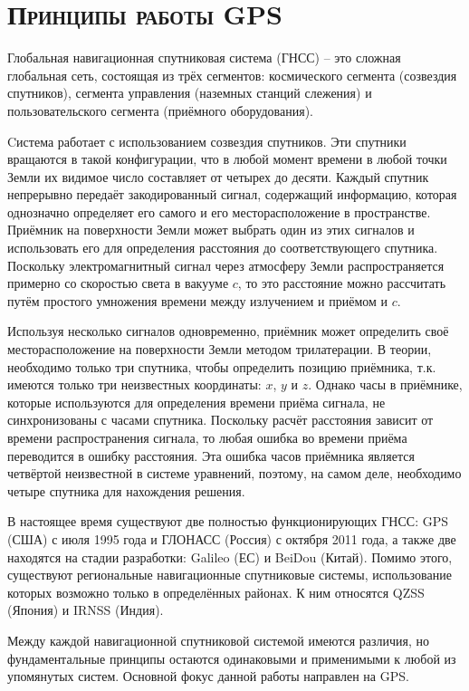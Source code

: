 \chapter{\textsc{Принципы работы GPS}}

Глобальная навигационная спутниковая система (ГНСС) -- это сложная глобальная сеть, состоящая из трёх сегментов: космического сегмента (созвездия спутников), сегмента управления (наземных станций слежения) и пользовательского сегмента (приёмного оборудования).

Cистема работает с использованием созвездия спутников.  
Эти спутники вращаются в такой конфигурации, что в любой момент времени в любой точки Земли их видимое число составляет от четырех до десяти.
Каждый спутник непрерывно передаёт закодированный сигнал, содержащий информацию, которая однозначно определяет его самого и его месторасположение в пространстве. 
Приёмник на поверхности Земли может выбрать один из этих сигналов и использовать его для определения расстояния до соответствующего спутника.  
Поскольку электромагнитный сигнал через атмосферу Земли распространяется примерно со скоростью света в вакууме $c$, то это расстояние можно рассчитать путём простого умножения времени между излучением и приёмом и $c$.

Используя несколько сигналов одновременно, приёмник может определить своё месторасположение на поверхности Земли методом трилатерации.
В теории, необходимо только три спутника, чтобы определить позицию приёмника, т.к. имеются только три неизвестных координаты: $x$, $y$ и $z$.   
Однако часы в приёмнике, которые используются для определения времени приёма сигнала, не синхронизованы с часами спутника.
Поскольку расчёт расстояния зависит от времени распространения сигнала, то любая ошибка во времени приёма переводится в ошибку расстояния.  
Эта ошибка часов приёмника является четвёртой неизвестной в системе уравнений, поэтому, на самом деле, необходимо четыре спутника для нахождения решения.

В настоящее время существуют две полностью функционирующих ГНСС: GPS (США) с июля 1995 года и ГЛОНАСС (Россия) с октября 2011 года, а также две находятся на стадии разработки: Galileo (ЕС) и BeiDou (Китай). 
Помимо этого, существуют региональные навигационные спутниковые системы, использование которых возможно только в определённых районах. 
К ним относятся QZSS (Япония) и IRNSS (Индия).  

Между каждой навигационной спутниковой системой имеются различия, но фундаментальные принципы остаются одинаковыми и применимыми к любой из упомянутых систем.
Основной фокус данной работы направлен на GPS.